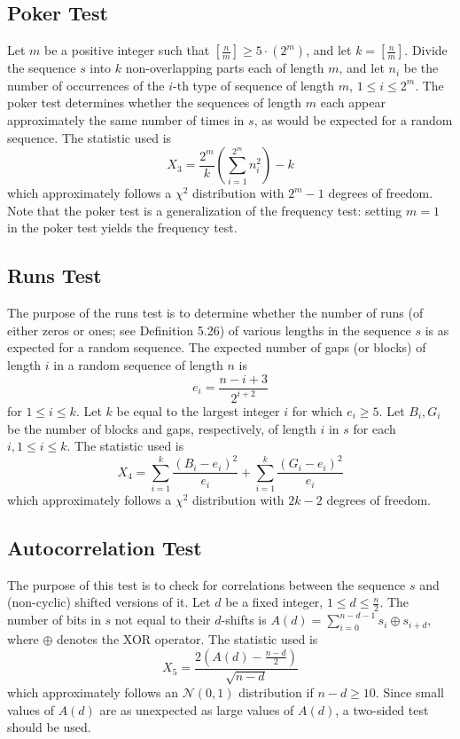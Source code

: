 \documentclass[12pt,openany]{book}
\theoremstyle{definition}
\begin{document}
\subsection{Poker Test}
Let \( m \) be a positive integer such that \( \left[ \frac{n}{m} \right] \geq 5 \cdot (2^m) \), and let \( k = \left[ \frac{n}{m} \right] \). Divide the sequence \( s \) into \( k \) non-overlapping parts each of length \( m \), and let \( n_i \) be the number of occurrences of the \( i \)-th type of sequence of length \( m \), \( 1 \leq i \leq 2^m \). The poker test determines whether the sequences of length \( m \) each appear approximately the same number of times in \( s \), as would be expected for a random sequence. The statistic used is
\[ X_3 = \frac{2^m}{k} \left( \sum_{i=1}^{2^m} n_i^2 \right) - k \]
which approximately follows a \( \chi^2 \) distribution with \( 2^m - 1 \) degrees of freedom. Note that the poker test is a generalization of the frequency test: setting \( m = 1 \) in the poker test yields the frequency test.

\newpage
\subsection{Runs Test}
The purpose of the runs test is to determine whether the number of runs (of either zeros or ones; see Definition 5.26) of various lengths in the sequence \( s \) is as expected for a random sequence. The expected number of gaps (or blocks) of length \( i \) in a random sequence of length \( n \) is
\[ e_i = \frac{n-i+3}{2^{i+2}} \]
for \( 1 \leq i \leq k \). Let \( k \) be equal to the largest integer \( i \) for which \( e_i \geq 5 \). Let \( B_i, G_i \) be the number of blocks and gaps, respectively, of length \( i \) in \( s \) for each \( i, 1 \leq i \leq k \). The statistic used is
\[ X_4 = \sum_{i=1}^{k} \frac{(B_i - e_i)^2}{e_i} + \sum_{i=1}^{k} \frac{(G_i - e_i)^2}{e_i} \]
which approximately follows a \( \chi^2 \) distribution with \( 2k - 2 \) degrees of freedom.

\newpage
\subsection{Autocorrelation Test}
The purpose of this test is to check for correlations between the sequence \( s \) and (non-cyclic) shifted versions of it. Let \( d \) be a fixed integer, \( 1 \leq d \leq \frac{n}{2} \). The number of bits in \( s \) not equal to their \( d \)-shifts is \( A(d) = \sum_{i=0}^{n-d-1} s_i \oplus s_{i+d} \), where \( \oplus \) denotes the XOR operator. The statistic used is
\[ X_5 = \frac{2(A(d) - \frac{n-d}{2})}{\sqrt{n-d}} \]
which approximately follows an \( \mathcal{N}(0, 1) \) distribution if \( n - d \geq 10 \). Since small values of \( A(d) \) are as unexpected as large values of \( A(d) \), a two-sided test should be used.
\end{document}
